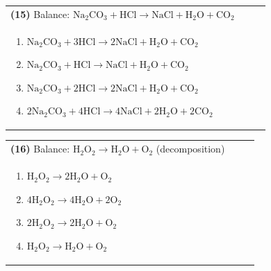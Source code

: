 \documentclass{article}
\begin{document}
\vspace{0.2cm}
\noindent \begin{tabular}{|p{0.9\linewidth}|}
\hline
\vspace{0.2cm}
\textbf{(15)} Balance: \(\mathrm{Na_2CO_3 + HCl \rightarrow NaCl + H_2O + CO_2}\)\\
\begin{minipage}[t]{0.85\linewidth}
\begin{enumerate}[label=\alph*.]
   \item \(\mathrm{Na_2CO_3 + 3HCl \rightarrow 2NaCl + H_2O + CO_2}\)
   \item \(\mathrm{Na_2CO_3 + HCl \rightarrow NaCl + H_2O + CO_2}\)
   \item \(\mathrm{Na_2CO_3 + 2HCl \rightarrow 2NaCl + H_2O + CO_2}\)
   \item \(\mathrm{2Na_2CO_3 + 4HCl \rightarrow 4NaCl + 2H_2O + 2CO_2}\)
\end{enumerate}
\end{minipage}\\
\hline
\end{tabular}

\vspace{0.2cm}
\noindent \begin{tabular}{|p{0.9\linewidth}|}
\hline
\vspace{0.2cm}
\textbf{(16)} Balance: \(\mathrm{H_2O_2 \rightarrow H_2O + O_2}\) (decomposition)\\
\begin{minipage}[t]{0.85\linewidth}
\begin{enumerate}[label=\alph*.]
   \item \(\mathrm{H_2O_2 \rightarrow 2H_2O + O_2}\)
   \item \(\mathrm{4H_2O_2 \rightarrow 4H_2O + 2O_2}\)
   \item \(\mathrm{2H_2O_2 \rightarrow 2H_2O + O_2}\)
   \item \(\mathrm{H_2O_2 \rightarrow H_2O + O_2}\)
\end{enumerate}
\end{minipage}\\
\hline
\end{tabular}
\newpage
\end{document}
